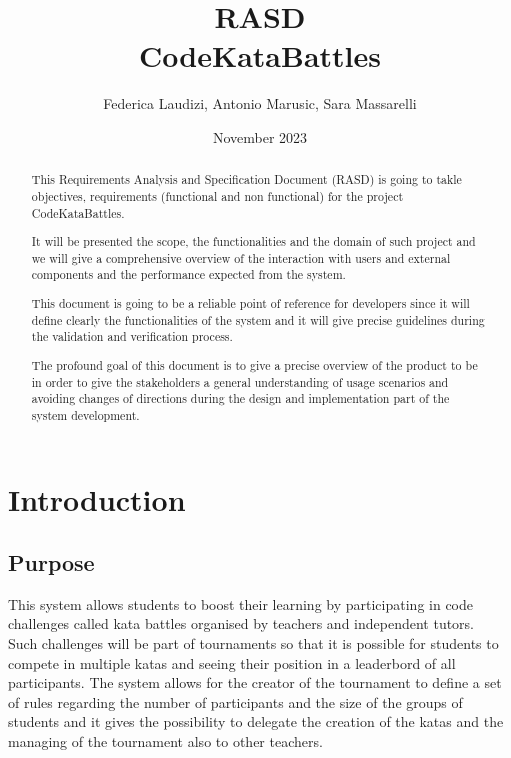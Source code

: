\documentclass{article}
\title{RASD\\ CodeKataBattles}
\author{Federica Laudizi, Antonio Marusic, Sara Massarelli}
\date{November 2023}
\begin{document}
\maketitle

\tableofcontents


\begin{abstract}
    This Requirements Analysis and Specification Document (RASD) is going to takle objectives, requirements (functional and non functional) for the project CodeKataBattles.
    
    It will be presented the scope, the functionalities and the domain of such project and we will give a comprehensive overview of the interaction with users and external components and the performance expected from the system.

    This document is going to be a reliable point of reference for developers since it will define clearly the functionalities of the system and it will give precise guidelines during the validation and verification process.

    The profound goal of this document is to give a precise overview of the product to be in order to give the stakeholders a general understanding of usage scenarios and avoiding changes of directions during the design and implementation part of the system development.    
\end{abstract}

\section{Introduction} 
    \subsection{Purpose}
        This system allows students to boost their learning by participating in
        code challenges called kata battles organised by teachers and independent tutors.\\

        Such challenges will be part of tournaments so that it is possible for students to compete in multiple katas and seeing their position in a leaderbord of all participants.
        The system allows for the creator of the tournament to define a set of rules regarding the number of participants and the size of the groups of students and it gives the possibility to delegate the creation of the katas and the managing of the tournament also to other teachers.\\
\end{document}
